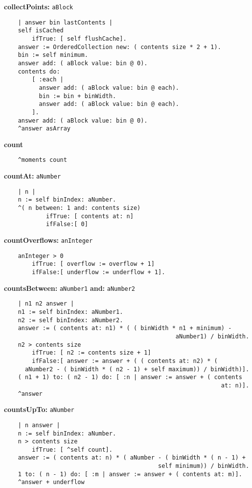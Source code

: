 {\bf collectPoints:} {\tt aBlock}
\begin{verbatim}
    | answer bin lastContents |
    self isCached
        ifTrue: [ self flushCache].
    answer := OrderedCollection new: ( contents size * 2 + 1).
    bin := self minimum.
    answer add: ( aBlock value: bin @ 0).
    contents do:
        [ :each |
          answer add: ( aBlock value: bin @ each).
          bin := bin + binWidth.
          answer add: ( aBlock value: bin @ each).
        ].
    answer add: ( aBlock value: bin @ 0).
    ^answer asArray

\end{verbatim}
{\bf count}
\begin{verbatim}
    ^moments count

\end{verbatim}
{\bf countAt:} {\tt aNumber}
\begin{verbatim}
    | n |
    n := self binIndex: aNumber.
    ^( n between: 1 and: contents size)
            ifTrue: [ contents at: n]
            ifFalse:[ 0]

\end{verbatim}
{\bf countOverflows:} {\tt anInteger}
\begin{verbatim}
    anInteger > 0
        ifTrue: [ overflow := overflow + 1]
        ifFalse:[ underflow := underflow + 1].

\end{verbatim}
{\bf countsBetween:} {\tt aNumber1} {\bf and:} {\tt aNumber2}
\begin{verbatim}
    | n1 n2 answer |
    n1 := self binIndex: aNumber1.
    n2 := self binIndex: aNumber2.
    answer := ( contents at: n1) * ( ( binWidth * n1 + minimum) - 
                                                 aNumber1) / binWidth.
    n2 > contents size
        ifTrue: [ n2 := contents size + 1]
        ifFalse:[ answer := answer + ( ( contents at: n2) * ( 
      aNumber2 - ( binWidth * ( n2 - 1) + self maximum)) / binWidth)].
    ( n1 + 1) to: ( n2 - 1) do: [ :n | answer := answer + ( contents 
                                                              at: n)].
    ^answer

\end{verbatim}
{\bf countsUpTo:} {\tt aNumber}
\begin{verbatim}
    | n answer |
    n := self binIndex: aNumber.
    n > contents size
        ifTrue: [ ^self count].
    answer := ( contents at: n) * ( aNumber - ( binWidth * ( n - 1) + 
                                            self minimum)) / binWidth.
    1 to: ( n - 1) do: [ :m | answer := answer + ( contents at: m)].
    ^answer + underflow

\end{verbatim}
